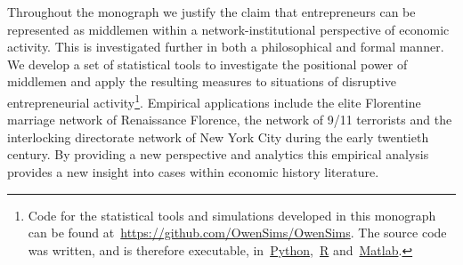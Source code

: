 \documentclass[11pt,fleqn]{book}
\begin{document}
\begin{singlespace}
Throughout the monograph we justify the claim that entrepreneurs can be represented as middlemen within a network-institutional perspective of economic activity. This is investigated further in both a philosophical and formal manner. We develop a set of statistical tools to investigate the positional power of middlemen and apply the resulting measures to situations of disruptive entrepreneurial activity\footnote{Code for the statistical tools and simulations developed in this monograph can be found at~\href{https://github.com/OwenSims/OwenSims}{https://github.com/OwenSims/OwenSims}. The source code was written, and is therefore executable, in~\href{https://www.python.org/}{Python},~\href{https://www.r-project.org/}{R} and~\href{http://www.mathworks.com/products/matlab}{Matlab}.}. Empirical applications include the elite Florentine marriage network of Renaissance Florence, the network of 9/11 terrorists and the interlocking directorate network of New York City during the early twentieth century. By providing a new perspective and analytics this empirical analysis provides a new insight into cases within economic history literature.

\end{singlespace}

\newpage
\mbox{}
\thispagestyle{empty}
\newpage













\singlespace





\end{document}
